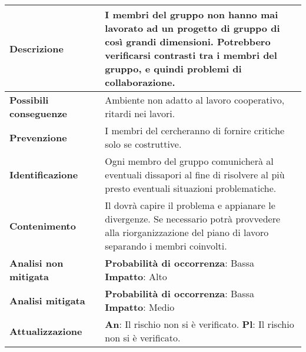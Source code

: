 					\small
					\begin{table}[H]
					\begin{center}			
					\begin{tabular}{p{2.5cm}p{0.5cm}p{11cm}}
					\arrayrulecolor{lightgray}
					
					\toprule				
						\textbf{Descrizione}
						& &
						I membri del gruppo non hanno mai lavorato ad un progetto di gruppo di così grandi dimensioni. Potrebbero verificarsi contrasti tra i membri del gruppo, e quindi problemi di collaborazione.
					\\
					\midrule
						\textbf{Possibili \newline conseguenze}
						& &
						Ambiente non adatto al lavoro cooperativo, ritardi nei lavori.
					\\
					\midrule
						\textbf{Prevenzione}
						& &
						 I membri del \glo{Gruppo}{team} cercheranno di fornire critiche solo se costruttive.
					\\
					\midrule
						\textbf{Identificazione}
						& &
						Ogni membro del gruppo comunicherà al \responsabilediprogetto{} eventuali dissapori al fine di risolvere al più presto eventuali situazioni problematiche.
					\\
					\midrule
						\textbf{Contenimento}
						& &
						Il \responsabilediprogetto{} dovrà capire il problema e appianare le divergenze. Se necessario potrà provvedere alla riorganizzazione del piano di lavoro separando i membri coinvolti.
					\\
					\midrule
						\textbf{Analisi \newline non mitigata}
						& &
						\textbf{Probabilità di occorrenza}: Bassa
						\newline
						\textbf{Impatto}: Alto
					\\
					\midrule
						\textbf{Analisi \newline mitigata}
						& &
						\textbf{Probabilità di occorrenza}: Bassa
						\newline
						\textbf{Impatto}: Medio
					\\
					\midrule
						\textbf{Attualizzazione}
						& &
						\textbf{An}: Il rischio non si è verificato.
						\newline
						\textbf{Pl}: Il rischio non si è verificato.
					\\
					
					\bottomrule	
					\end{tabular}
					\end{center}
					\end{table}			

